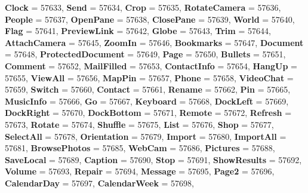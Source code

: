 \begin{DoxyCompactItemize}
{\bfseries Clock} = 57633, 
{\bfseries Send} = 57634, 
{\bfseries Crop} = 57635, 
{\bfseries Rotate\+Camera} = 57636, 
\newline
{\bfseries People} = 57637, 
{\bfseries Open\+Pane} = 57638, 
{\bfseries Close\+Pane} = 57639, 
{\bfseries World} = 57640, 
\newline
{\bfseries Flag} = 57641, 
{\bfseries Preview\+Link} = 57642, 
{\bfseries Globe} = 57643, 
{\bfseries Trim} = 57644, 
\newline
{\bfseries Attach\+Camera} = 57645, 
{\bfseries Zoom\+In} = 57646, 
{\bfseries Bookmarks} = 57647, 
{\bfseries Document} = 57648, 
\newline
{\bfseries Protected\+Document} = 57649, 
{\bfseries Page} = 57650, 
{\bfseries Bullets} = 57651, 
{\bfseries Comment} = 57652, 
\newline
{\bfseries Mail\+Filled} = 57653, 
{\bfseries Contact\+Info} = 57654, 
{\bfseries Hang\+Up} = 57655, 
{\bfseries View\+All} = 57656, 
\newline
{\bfseries Map\+Pin} = 57657, 
{\bfseries Phone} = 57658, 
{\bfseries Video\+Chat} = 57659, 
{\bfseries Switch} = 57660, 
\newline
{\bfseries Contact} = 57661, 
{\bfseries Rename} = 57662, 
{\bfseries Pin} = 57665, 
{\bfseries Music\+Info} = 57666, 
\newline
{\bfseries Go} = 57667, 
{\bfseries Keyboard} = 57668, 
{\bfseries Dock\+Left} = 57669, 
{\bfseries Dock\+Right} = 57670, 
\newline
{\bfseries Dock\+Bottom} = 57671, 
{\bfseries Remote} = 57672, 
{\bfseries Refresh} = 57673, 
{\bfseries Rotate} = 57674, 
\newline
{\bfseries Shuffle} = 57675, 
{\bfseries List} = 57676, 
{\bfseries Shop} = 57677, 
{\bfseries Select\+All} = 57678, 
\newline
{\bfseries Orientation} = 57679, 
{\bfseries Import} = 57680, 
{\bfseries Import\+All} = 57681, 
{\bfseries Browse\+Photos} = 57685, 
\newline
{\bfseries Web\+Cam} = 57686, 
{\bfseries Pictures} = 57688, 
{\bfseries Save\+Local} = 57689, 
{\bfseries Caption} = 57690, 
\newline
{\bfseries Stop} = 57691, 
{\bfseries Show\+Results} = 57692, 
{\bfseries Volume} = 57693, 
{\bfseries Repair} = 57694, 
\newline
{\bfseries Message} = 57695, 
{\bfseries Page2} = 57696, 
{\bfseries Calendar\+Day} = 57697, 
{\bfseries Calendar\+Week} = 57698, 
\newline

\end{DoxyCompactItemize}
